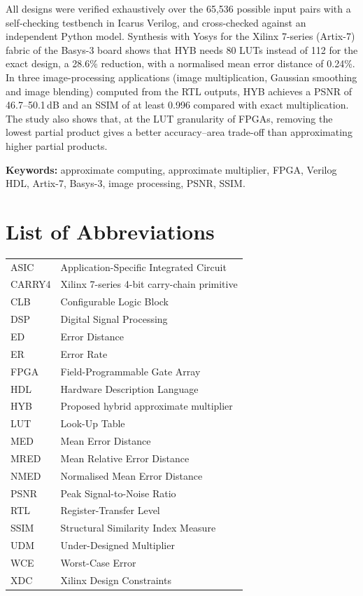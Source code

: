 \documentclass[12pt,a4paper,oneside]{report}
\begin{document}
All designs were verified exhaustively over the 65{,}536 possible input pairs with a self-checking testbench in Icarus Verilog, and cross-checked against an independent Python model. Synthesis with Yosys for the Xilinx 7-series (Artix-7) fabric of the Basys-3 board shows that HYB needs 80 LUTs instead of 112 for the exact design, a 28.6\% reduction, with a normalised mean error distance of 0.24\%. In three image-processing applications (image multiplication, Gaussian smoothing and image blending) computed from the RTL outputs, HYB achieves a PSNR of 46.7--50.1\,dB and an SSIM of at least 0.996 compared with exact multiplication. The study also shows that, at the LUT granularity of FPGAs, removing the lowest partial product gives a better accuracy--area trade-off than approximating higher partial products.

\vspace{0.5cm}
\noindent\textbf{Keywords:} approximate computing, approximate multiplier, FPGA, Verilog HDL, Artix-7, Basys-3, image processing, PSNR, SSIM.

\tableofcontents
\listoffigures
\listoftables

\chapter*{List of Abbreviations}
\begin{tabular}{@{}ll@{}}
ASIC & Application-Specific Integrated Circuit \\
CARRY4 & Xilinx 7-series 4-bit carry-chain primitive \\
CLB & Configurable Logic Block \\
DSP & Digital Signal Processing \\
ED & Error Distance \\
ER & Error Rate \\
FPGA & Field-Programmable Gate Array \\
HDL & Hardware Description Language \\
HYB & Proposed hybrid approximate multiplier \\
LUT & Look-Up Table \\
MED & Mean Error Distance \\
MRED & Mean Relative Error Distance \\
NMED & Normalised Mean Error Distance \\
PSNR & Peak Signal-to-Noise Ratio \\
RTL & Register-Transfer Level \\
SSIM & Structural Similarity Index Measure \\
UDM & Under-Designed Multiplier \\
WCE & Worst-Case Error \\
XDC & Xilinx Design Constraints \\
\end{tabular}
\end{document}
